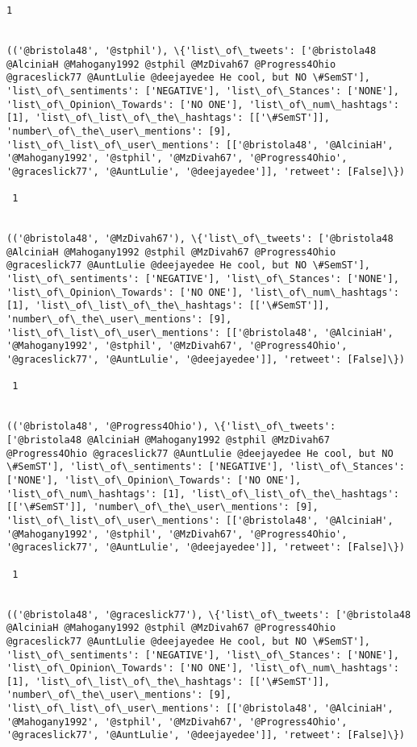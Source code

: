 \documentclass[11pt]{article}
\begin{document}
\begin{Verbatim}[commandchars=\\\{\}]
 1
 

(('@bristola48', '@stphil'), \{'list\_of\_tweets': ['@bristola48 @AlciniaH @Mahogany1992 @stphil @MzDivah67 @Progress4Ohio @graceslick77 @AuntLulie @deejayedee He cool, but NO \#SemST'], 'list\_of\_sentiments': ['NEGATIVE'], 'list\_of\_Stances': ['NONE'], 'list\_of\_Opinion\_Towards': ['NO ONE'], 'list\_of\_num\_hashtags': [1], 'list\_of\_list\_of\_the\_hashtags': [['\#SemST']], 'number\_of\_the\_user\_mentions': [9], 'list\_of\_list\_of\_user\_mentions': [['@bristola48', '@AlciniaH', '@Mahogany1992', '@stphil', '@MzDivah67', '@Progress4Ohio', '@graceslick77', '@AuntLulie', '@deejayedee']], 'retweet': [False]\})

 1
 

(('@bristola48', '@MzDivah67'), \{'list\_of\_tweets': ['@bristola48 @AlciniaH @Mahogany1992 @stphil @MzDivah67 @Progress4Ohio @graceslick77 @AuntLulie @deejayedee He cool, but NO \#SemST'], 'list\_of\_sentiments': ['NEGATIVE'], 'list\_of\_Stances': ['NONE'], 'list\_of\_Opinion\_Towards': ['NO ONE'], 'list\_of\_num\_hashtags': [1], 'list\_of\_list\_of\_the\_hashtags': [['\#SemST']], 'number\_of\_the\_user\_mentions': [9], 'list\_of\_list\_of\_user\_mentions': [['@bristola48', '@AlciniaH', '@Mahogany1992', '@stphil', '@MzDivah67', '@Progress4Ohio', '@graceslick77', '@AuntLulie', '@deejayedee']], 'retweet': [False]\})

 1
 

(('@bristola48', '@Progress4Ohio'), \{'list\_of\_tweets': ['@bristola48 @AlciniaH @Mahogany1992 @stphil @MzDivah67 @Progress4Ohio @graceslick77 @AuntLulie @deejayedee He cool, but NO \#SemST'], 'list\_of\_sentiments': ['NEGATIVE'], 'list\_of\_Stances': ['NONE'], 'list\_of\_Opinion\_Towards': ['NO ONE'], 'list\_of\_num\_hashtags': [1], 'list\_of\_list\_of\_the\_hashtags': [['\#SemST']], 'number\_of\_the\_user\_mentions': [9], 'list\_of\_list\_of\_user\_mentions': [['@bristola48', '@AlciniaH', '@Mahogany1992', '@stphil', '@MzDivah67', '@Progress4Ohio', '@graceslick77', '@AuntLulie', '@deejayedee']], 'retweet': [False]\})

 1
 

(('@bristola48', '@graceslick77'), \{'list\_of\_tweets': ['@bristola48 @AlciniaH @Mahogany1992 @stphil @MzDivah67 @Progress4Ohio @graceslick77 @AuntLulie @deejayedee He cool, but NO \#SemST'], 'list\_of\_sentiments': ['NEGATIVE'], 'list\_of\_Stances': ['NONE'], 'list\_of\_Opinion\_Towards': ['NO ONE'], 'list\_of\_num\_hashtags': [1], 'list\_of\_list\_of\_the\_hashtags': [['\#SemST']], 'number\_of\_the\_user\_mentions': [9], 'list\_of\_list\_of\_user\_mentions': [['@bristola48', '@AlciniaH', '@Mahogany1992', '@stphil', '@MzDivah67', '@Progress4Ohio', '@graceslick77', '@AuntLulie', '@deejayedee']], 'retweet': [False]\})


\end{Verbatim}
\end{document}
